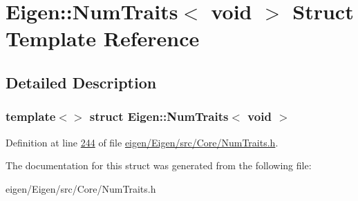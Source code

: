 \hypertarget{struct_eigen_1_1_num_traits_3_01void_01_4}{}\section{Eigen\+:\+:Num\+Traits$<$ void $>$ Struct Template Reference}
\label{struct_eigen_1_1_num_traits_3_01void_01_4}


\subsection{Detailed Description}
\subsubsection*{template$<$$>$\newline
struct Eigen\+::\+Num\+Traits$<$ void $>$}



Definition at line \hyperlink{eigen_2_eigen_2src_2_core_2_num_traits_8h_source_l00244}{244} of file \hyperlink{eigen_2_eigen_2src_2_core_2_num_traits_8h_source}{eigen/\+Eigen/src/\+Core/\+Num\+Traits.\+h}.



The documentation for this struct was generated from the following file\+:\begin{DoxyCompactItemize}
\item 
eigen/\+Eigen/src/\+Core/\+Num\+Traits.\+h\end{DoxyCompactItemize}
